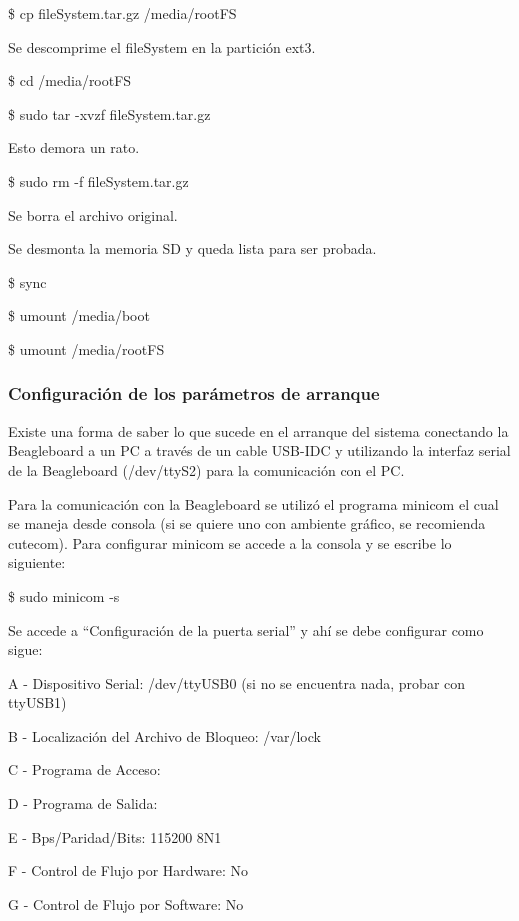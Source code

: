 \centerline{\$ cp fileSystem.tar.gz /media/rootFS}

\bigskip
Se descomprime el fileSystem en la partición ext3.

\bigskip
\centerline{\$ cd /media/rootFS}

\centerline{\$ sudo tar -xvzf fileSystem.tar.gz}

Esto demora un rato.

\centerline{\$ sudo rm -f fileSystem.tar.gz}

Se borra el archivo original.

\newpage
Se desmonta la memoria SD y queda lista para ser probada. 

\bigskip
\centerline{\$ sync}

\centerline{\$ umount /media/boot}

\centerline{\$ umount /media/rootFS}

\subsubsection{Configuración de los parámetros de arranque}

Existe una forma de saber lo que sucede en el arranque del sistema conectando la Beagleboard a un PC a través de un cable USB-IDC y utilizando la interfaz serial de la Beagleboard (/dev/ttyS2) para la comunicación con el PC.

\bigskip
{}

\bigskip
Para la comunicación con la Beagleboard se utilizó el programa minicom el cual se maneja 
desde consola (si se quiere uno con ambiente gráfico, se recomienda cutecom). 
Para configurar minicom se accede a la consola y se escribe lo siguiente: 

\bigskip
\centerline{\$ sudo minicom -s}

\bigskip
Se accede a “Configuración de la puerta serial” y ahí se debe configurar como sigue: 

A - Dispositivo Serial: /dev/ttyUSB0 (si no se encuentra nada, probar con ttyUSB1) 

B - Localización del Archivo de Bloqueo: /var/lock 

C - Programa de Acceso: 

D - Programa de Salida: 

E - Bps/Paridad/Bits: 115200 8N1 

F - Control de Flujo por Hardware: No 

G - Control de Flujo por Software: No 

